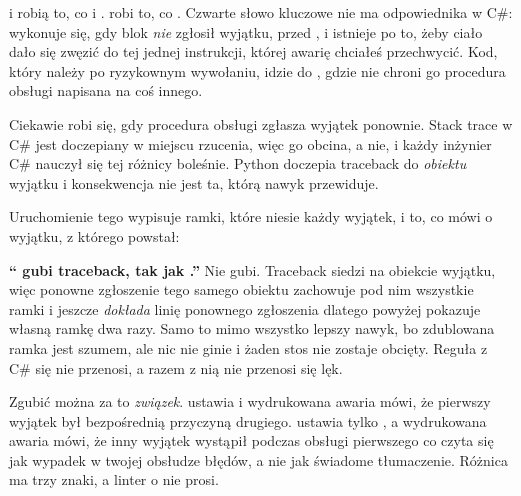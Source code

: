  i  robią to, co  i .
 robi to, co . Czwarte słowo kluczowe nie ma
odpowiednika w C\#:  wykonuje się, gdy blok 
\emph{nie} zgłosił wyjątku, przed , i istnieje po to, żeby ciało
 dało się zwęzić do tej jednej instrukcji, której awarię chciałeś
przechwycić. Kod, który należy po ryzykownym wywołaniu, idzie do ,
gdzie nie chroni go procedura obsługi napisana na coś innego.

Ciekawie robi się, gdy procedura obsługi zgłasza wyjątek ponownie. Stack trace
w C\# jest doczepiany w miejscu rzucenia, więc  go obcina, a
 nie, i każdy inżynier C\# nauczył się tej różnicy boleśnie.
Python doczepia traceback do \emph{obiektu} wyjątku i konsekwencja nie jest
ta, którą nawyk przewiduje.


\noindent
Uruchomienie tego wypisuje ramki, które niesie każdy wyjątek, i to, co mówi o
wyjątku, z którego powstał:


\begin{trapbox}
\textbf{\enquote{ gubi traceback, tak jak .}}
Nie gubi. Traceback siedzi na obiekcie wyjątku, więc ponowne zgłoszenie tego
samego obiektu zachowuje pod nim wszystkie ramki i jeszcze \emph{dokłada}
linię ponownego zgłoszenia \dash{} dlatego  powyżej pokazuje
własną ramkę dwa razy. Samo  to mimo wszystko lepszy nawyk, bo
zdublowana ramka jest szumem, ale nic nie ginie i żaden stos nie zostaje
obcięty. Reguła z C\# się nie przenosi, a razem z nią nie przenosi się lęk.
\end{trapbox}

\noindent
Zgubić można za to \emph{związek}.  ustawia
 i wydrukowana awaria mówi, że pierwszy wyjątek był
bezpośrednią przyczyną drugiego.  ustawia tylko
, a wydrukowana awaria mówi, że inny wyjątek wystąpił
podczas obsługi pierwszego \dash{} co czyta się jak wypadek w twojej obsłudze
błędów, a nie jak świadome tłumaczenie. Różnica ma trzy znaki, a linter o nie
prosi.


